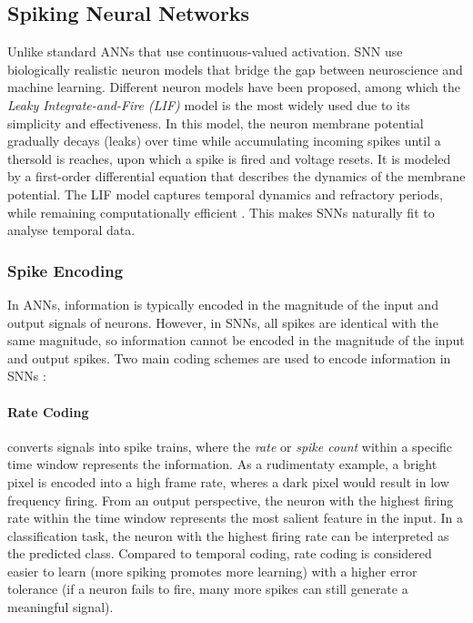 \documentclass{article}
\begin{document}
\subsection{Spiking Neural Networks}
Unlike standard ANNs that use continuous-valued activation. SNN use biologically realistic neuron models that bridge the gap between neuroscience and machine learning. Different neuron models have been proposed, among which the \textit{Leaky Integrate-and-Fire (LIF)} model is the most widely used due to its simplicity and effectiveness. In this model, the neuron membrane potential gradually decays (leaks) over time while accumulating incoming spikes until a thersold is reaches, upon which a spike is fired and voltage resets. It is modeled by a first-order differential equation that describes the dynamics of the membrane potential. The LIF model captures temporal dynamics and refractory periods,  while remaining computationally efficient \cite{yamazakiSpikingNeuralNetworks2022, izhikevichSimpleModelSpiking2003, eshraghianTrainingSpikingNeural2023}. This makes SNNs naturally fit to analyse temporal data.

\subsubsection{Spike Encoding}
In ANNs, information is typically encoded in the magnitude of the input and output signals of neurons. However, in SNNs, all spikes are identical with the same magnitude, so information cannot be encoded in the magnitude of the input and output spikes. Two main coding schemes are used to encode information in SNNs \cite{eshraghianTrainingSpikingNeural2023}:

\paragraph {Rate Coding} converts signals into spike trains, where the \textit{rate} or \textit{spike count} within a specific time window represents the information. As a rudimentaty example, a bright pixel is encoded into a high frame rate, wheres a dark pixel would result in low frequency firing. From an output perspective, the neuron with the highest firing rate within the time window represents the most salient feature in the input. In a classification task, the neuron with the highest firing rate can be interpreted as the predicted class. Compared to temporal coding, rate coding is considered easier to learn (more spiking promotes more learning) with a higher error tolerance (if a neuron fails to fire, many more spikes can still generate a meaningful signal).
\end{document}
